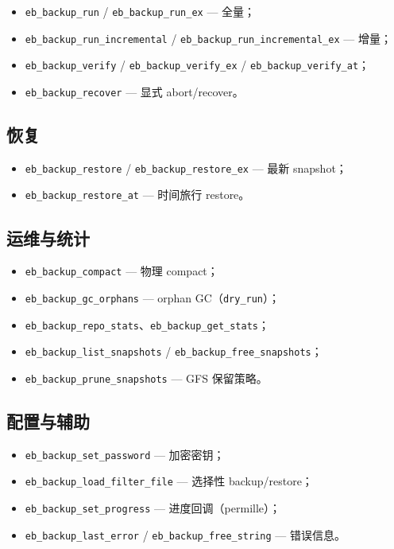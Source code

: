 \begin{itemize}[nosep]
  \item \texttt{eb\_backup\_run} / \texttt{eb\_backup\_run\_ex} — 全量；
  \item \texttt{eb\_backup\_run\_incremental} / \texttt{eb\_backup\_run\_incremental\_ex} — 增量；
  \item \texttt{eb\_backup\_verify} / \texttt{eb\_backup\_verify\_ex} / \texttt{eb\_backup\_verify\_at}；
  \item \texttt{eb\_backup\_recover} — 显式 abort/recover。
\end{itemize}

\subsection{恢复}

\begin{itemize}[nosep]
  \item \texttt{eb\_backup\_restore} / \texttt{eb\_backup\_restore\_ex} — 最新 snapshot；
  \item \texttt{eb\_backup\_restore\_at} — 时间旅行 restore。
\end{itemize}

\subsection{运维与统计}

\begin{itemize}[nosep]
  \item \texttt{eb\_backup\_compact} — 物理 compact；
  \item \texttt{eb\_backup\_gc\_orphans} — orphan GC（\texttt{dry\_run}）；
  \item \texttt{eb\_backup\_repo\_stats}、\texttt{eb\_backup\_get\_stats}；
  \item \texttt{eb\_backup\_list\_snapshots} / \texttt{eb\_backup\_free\_snapshots}；
  \item \texttt{eb\_backup\_prune\_snapshots} — GFS 保留策略。
\end{itemize}

\subsection{配置与辅助}

\begin{itemize}[nosep]
  \item \texttt{eb\_backup\_set\_password} — 加密密钥；
  \item \texttt{eb\_backup\_load\_filter\_file} — 选择性 backup/restore；
  \item \texttt{eb\_backup\_set\_progress} — 进度回调（permille）；
  \item \texttt{eb\_backup\_last\_error} / \texttt{eb\_backup\_free\_string} — 错误信息。
\end{itemize}

